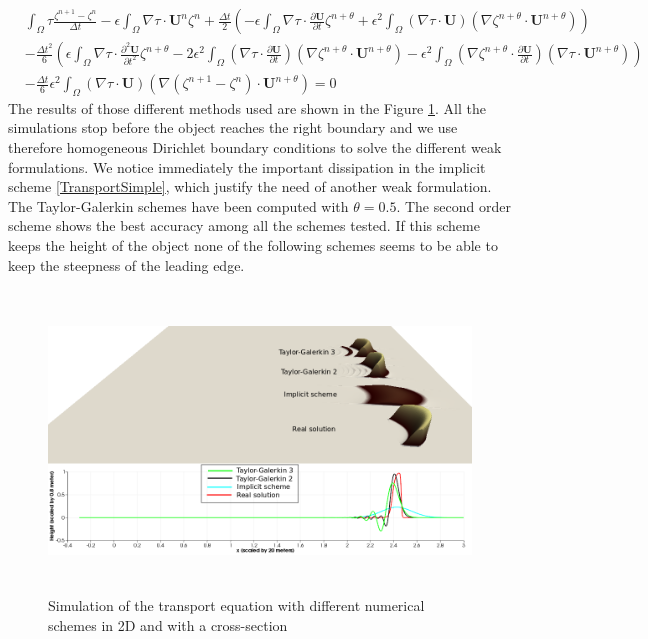 \documentclass[11pt,a4paper]{article}
\begin{document}
	\begin{align*}
		& \displaystyle \int_{\Omega}{\! \tau \frac{\zeta^{n+1} - \zeta^n}{\Delta t}}  -   \epsilon \int_{\Omega}{\! \nabla \tau \cdot  \mathbf{U}^n  \zeta^n} + \frac{\Delta t}{2}\left( - \epsilon \int_{\Omega}{\! \nabla \tau \cdot \frac{\partial \mathbf{U}}{\partial t} \zeta^{n+\theta}}
		 +  \epsilon^2 \int_{\Omega}{\! (\nabla \tau \cdot \mathbf{U})(\nabla \zeta^{n+\theta} \cdot \mathbf{U}^{n+\theta})}\right) \\
		 & -\frac{\Delta t^2}{6}\left(\epsilon \int_{\Omega}{\! \nabla \tau \cdot \frac{\partial^2 \mathbf{U}}{\partial t^2} \zeta^{n+\theta}} -2\epsilon^2 \int_{\Omega}{\! (\nabla \tau \cdot \frac{\partial \mathbf{U}}{\partial t})(\nabla \zeta^{n+\theta} \cdot \mathbf{U}^{n+\theta})} -\epsilon^2 \int_{\Omega}{\! (\nabla \zeta^{n+\theta} \cdot \frac{\partial \mathbf{U}}{\partial t})(\nabla \tau \cdot \mathbf{U}^{n+\theta})}\right) \\
		 & -\frac{\Delta t}{6} \epsilon^2 \int_{\Omega}{\! (\nabla \tau \cdot \mathbf{U})(\nabla (\zeta^{n+1} -  \zeta^n) \cdot \mathbf{U}^{n+\theta})}  = 0
	\end{align*}	
	The results of those different methods used are shown in the Figure \ref{Transport}. All the simulations stop before the object reaches the right boundary and we use therefore homogeneous Dirichlet boundary conditions to solve the different weak formulations. We notice immediately the important dissipation in the implicit scheme \eqref{TransportSimple}, which justify the need of another weak formulation. The Taylor-Galerkin schemes have been computed with $\theta = 0.5$. The second order scheme shows the best accuracy among all the schemes tested. If this scheme keeps the height of the object none of the following schemes seems to be able to keep the steepness of the leading edge.
	\begin{figure}
		\includegraphics[height=8cm]{TransportComparison.png}
		\caption{Simulation of the transport equation with different numerical schemes in 2D and with a cross-section}
		\label{Transport}
	\end{figure}
\end{document}
